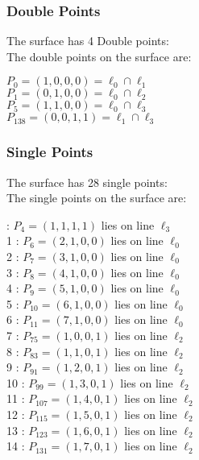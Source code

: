 \documentclass{article}
\begin{document}
{\subsubsection*{Double Points}
The surface has 4 Double points:\\
The double points on the surface are:\\
\begin{multicols}{2}
\noindent
$P_{0} = ( 1, 0, 0, 0 ) = \ell_{0} \cap \ell_{1} $\\
$P_{1} = ( 0, 1, 0, 0 ) = \ell_{0} \cap \ell_{2} $\\
$P_{5} = ( 1, 1, 0, 0 ) = \ell_{0} \cap \ell_{3} $\\
$P_{138} = ( 0, 0, 1, 1 ) = \ell_{1} \cap \ell_{3} $\\
\end{multicols}
\subsubsection*{Single Points}
The surface has 28 single points:\\
The single points on the surface are:\\
\begin{multicols}{2}
 : $P_{4}=( 1, 1, 1, 1 )$ lies on line $\ell_{3}$\\
1 : $P_{6}=( 2, 1, 0, 0 )$ lies on line $\ell_{0}$\\
2 : $P_{7}=( 3, 1, 0, 0 )$ lies on line $\ell_{0}$\\
3 : $P_{8}=( 4, 1, 0, 0 )$ lies on line $\ell_{0}$\\
4 : $P_{9}=( 5, 1, 0, 0 )$ lies on line $\ell_{0}$\\
5 : $P_{10}=( 6, 1, 0, 0 )$ lies on line $\ell_{0}$\\
6 : $P_{11}=( 7, 1, 0, 0 )$ lies on line $\ell_{0}$\\
7 : $P_{75}=( 1, 0, 0, 1 )$ lies on line $\ell_{2}$\\
8 : $P_{83}=( 1, 1, 0, 1 )$ lies on line $\ell_{2}$\\
9 : $P_{91}=( 1, 2, 0, 1 )$ lies on line $\ell_{2}$\\
10 : $P_{99}=( 1, 3, 0, 1 )$ lies on line $\ell_{2}$\\
11 : $P_{107}=( 1, 4, 0, 1 )$ lies on line $\ell_{2}$\\
12 : $P_{115}=( 1, 5, 0, 1 )$ lies on line $\ell_{2}$\\
13 : $P_{123}=( 1, 6, 0, 1 )$ lies on line $\ell_{2}$\\
14 : $P_{131}=( 1, 7, 0, 1 )$ lies on line $\ell_{2}$\\

\end{multicols}}
\end{document}
